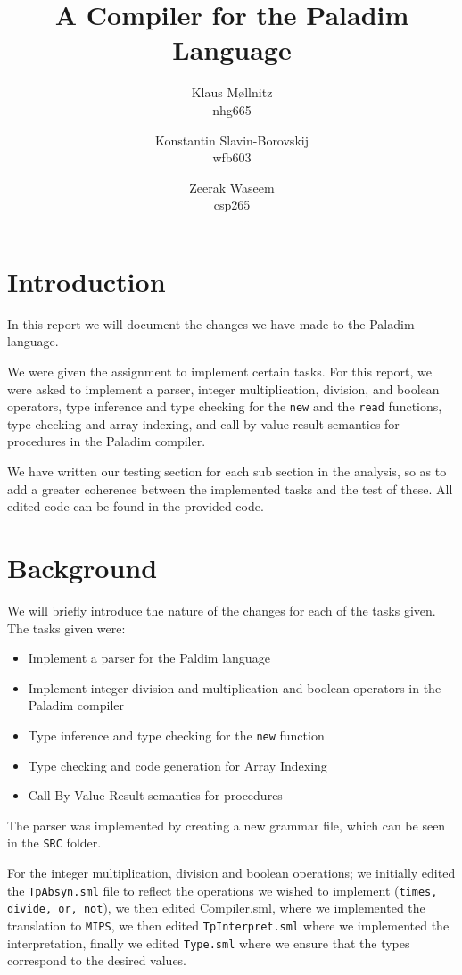 \documentclass[10pt]{article}
\title{A Compiler for the \textbf{Paladim} Language}
\author{
    Klaus Møllnitz\\
    nhg665
  \and
    Konstantin Slavin-Borovskij\\
    wfb603
  \and
    Zeerak Waseem\\
    csp265
}
\begin{document}
\maketitle

\renewcommand{\contentsname}{\section{Table of contents}}
\tableofcontents
\section{Introduction}
In this report we will document the changes we have made to the Paladim language. 

We were given the assignment to implement certain tasks. For this report, we were asked to implement a parser, integer multiplication, division, and boolean operators, type inference and type checking for the \texttt{new} and the \texttt{read} functions, type checking and array indexing, and call-by-value-result semantics for procedures in the Paladim compiler.

We have written our testing section for each sub section in the analysis, so as to add a greater coherence between the implemented tasks and the test of these. All edited code can be found in the provided code.

\section{Background}

We will briefly introduce the nature of the changes for each of the tasks given. The tasks given were:
\begin{itemize}
\item Implement a parser for the Paldim language
\item Implement integer division and multiplication and boolean operators in the Paladim compiler
\item Type inference and type checking for the \texttt{new} function
\item Type checking and code generation for Array Indexing
\item Call-By-Value-Result semantics for procedures
\end{itemize}

The parser was implemented by creating a new grammar file, which can be seen in the \texttt{SRC} folder.

For the integer multiplication, division and boolean operations; we initially edited the \texttt{TpAbsyn.sml} file to reflect the operations we wished to implement (\texttt{times, divide, or, not}), we then edited Compiler.sml, where we implemented the translation to \texttt{MIPS}, we then edited \texttt{TpInterpret.sml} where we implemented the interpretation, finally we edited \texttt{Type.sml} where we ensure that the types correspond to the desired values.
\end{document}
